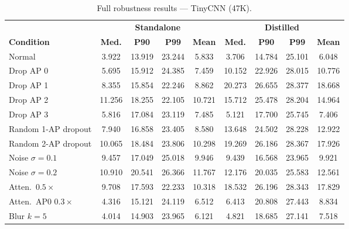 \begin{table}[H]
\centering
\caption{Full robustness results --- TinyCNN (47K).}
\label{tab:app:robust_tinycnn}
\small
\begin{tabular}{@{}lcccc|cccc@{}}
\toprule
 & \multicolumn{4}{c|}{\textbf{Standalone}} & \multicolumn{4}{c}{\textbf{Distilled}} \\
\textbf{Condition} & \textbf{Med.} & \textbf{P90} & \textbf{P99} & \textbf{Mean} & \textbf{Med.} & \textbf{P90} & \textbf{P99} & \textbf{Mean} \\
\midrule
Normal                 & 3.922 & 13.919& 23.244 & 5.833 & 3.706 & 14.784& 25.101 & 6.048 \\
Drop AP 0              & 5.695 & 15.912& 24.385 & 7.459 & 10.152& 22.926& 28.015 & 10.776\\
Drop AP 1              & 8.355 & 15.854& 22.246 & 8.862 & 20.273& 26.655& 28.377 & 18.668\\
Drop AP 2              & 11.256& 18.255& 22.105 & 10.721& 15.712& 25.478& 28.204 & 14.964\\
Drop AP 3              & 5.816 & 17.084& 23.119 & 7.485 & 5.121 & 17.700& 25.745 & 7.406 \\
Random 1-AP dropout    & 7.940 & 16.858& 23.405 & 8.580 & 13.648& 24.502& 28.228 & 12.922\\
Random 2-AP dropout    & 10.065& 18.484& 23.806 & 10.298& 19.269& 26.186& 28.367 & 17.926\\
Noise $\sigma{=}0.1$   & 9.457 & 17.049& 25.018 & 9.946 & 9.439 & 16.568& 23.965 & 9.921 \\
Noise $\sigma{=}0.2$   & 10.910& 20.541& 26.366 & 11.767& 12.176& 20.035& 25.583 & 12.561\\
Atten.\ $0.5\times$    & 9.708 & 17.593& 22.233 & 10.318& 18.532& 26.196& 28.343 & 17.829\\
Atten.\ AP0 $0.3\times$& 4.316 & 15.121& 24.119 & 6.512 & 6.413 & 20.808& 27.443 & 8.834 \\
Blur $k{=}5$           & 4.014 & 14.903& 23.965 & 6.121 & 4.821 & 18.685& 27.141 & 7.518 \\
\bottomrule
\end{tabular}
\end{table}

